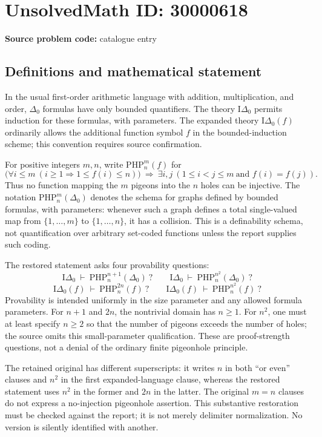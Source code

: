 \documentclass[11pt]{article}
\begin{document}
\section*{UnsolvedMath ID: 30000618}
\textbf{Source problem code:} catalogue entry
\subsection{Definitions and mathematical statement}
In the usual first-order arithmetic language with addition, multiplication, and order, $\Delta_0$ formulas have only bounded quantifiers. The theory $\mathrm I\Delta_0$ permits induction for these formulas, with parameters. The expanded theory $\mathrm I\Delta_0(f)$ ordinarily allows the additional function symbol $f$ in the bounded-induction scheme; this convention requires source confirmation.

For positive integers $m,n$, write $\mathrm{PHP}_n^m(f)$ for
\[
 \bigl(\forall i\le m\ (i\ge1\Rightarrow1\le f(i)\le n)\bigr)
 \ \Longrightarrow\
 \exists i,j\ (1\le i<j\le m\ \text{and }f(i)=f(j)).
\]
Thus no function mapping the $m$ pigeons into the $n$ holes can be injective. The notation $\mathrm{PHP}_n^m(\Delta_0)$ denotes the schema for graphs defined by bounded formulas, with parameters: whenever such a graph defines a total single-valued map from $\{1,\ldots,m\}$ to $\{1,\ldots,n\}$, it has a collision. This is a definability schema, not quantification over arbitrary set-coded functions unless the report supplies such coding.

The restored statement asks four provability questions:
\[
 \mathrm I\Delta_0\ \vdash\ \mathrm{PHP}_n^{n+1}(\Delta_0)\ ?
 \qquad
 \mathrm I\Delta_0\ \vdash\ \mathrm{PHP}_n^{n^2}(\Delta_0)\ ?
\]
\[
 \mathrm I\Delta_0(f)\ \vdash\ \mathrm{PHP}_n^{2n}(f)\ ?
 \qquad
 \mathrm I\Delta_0(f)\ \vdash\ \mathrm{PHP}_n^{n^2}(f)\ ?
\]
Provability is intended uniformly in the size parameter and any allowed formula parameters. For $n+1$ and $2n$, the nontrivial domain has $n\ge1$. For $n^2$, one must at least specify $n\ge2$ so that the number of pigeons exceeds the number of holes; the source omits this small-parameter qualification. These are proof-strength questions, not a denial of the ordinary finite pigeonhole principle.

The retained original has different superscripts: it writes $n$ in both ``or even'' clauses and $n^2$ in the first expanded-language clause, whereas the restored statement uses $n^2$ in the former and $2n$ in the latter. The original $m=n$ clauses do not express a no-injection pigeonhole assertion. This substantive restoration must be checked against the report; it is not merely delimiter normalization. No version is silently identified with another.
\end{document}
